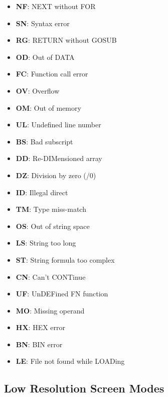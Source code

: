\documentclass[a4paper,11pt]{article}
\begin{document}
    \begin{itemize}
        \item \textbf{NF}: NEXT without FOR
        \item \textbf{SN}: Syntax error
        \item \textbf{RG}: RETURN without GOSUB
        \item \textbf{OD}: Out of DATA
        \item \textbf{FC}: Function call error
        \item \textbf{OV}: Overflow
        \item \textbf{OM}: Out of memory
        \item \textbf{UL}: Undefined line number
        \item \textbf{BS}: Bad subscript
        \item \textbf{DD}: Re-DIMensioned array
        \item \textbf{DZ}: Division by zero (/0)
        \item \textbf{ID}: Illegal direct
        \item \textbf{TM}: Type miss-match
        \item \textbf{OS}: Out of string space
        \item \textbf{LS}: String too long
        \item \textbf{ST}: String formula too complex
        \item \textbf{CN}: Can't CONTinue
        \item \textbf{UF}: UnDEFined FN function
        \item \textbf{MO}: Missing operand
        \item \textbf{HX}: HEX error
        \item \textbf{BN}: BIN error
        \item \textbf{LE}: File not found while LOADing
    \end{itemize}

    \subsection{Low Resolution Screen Modes}
    \label{sec:vdpscrmodes}
\end{document}
